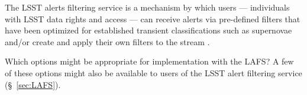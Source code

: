 \documentclass[DM,lsstdraft,authoryear,toc]{lsstdoc}
\begin{document}
The LSST alerts filtering service is a mechanism by which users --- individuals with LSST data rights and access --- can receive alerts via pre-defined filters that have been optimized for established transient classifications such as supernovae and/or create and apply their own filters to the stream . 

Which options might be appropriate for implementation with the LAFS?
A few of these options might also be available to users of the LSST alert filtering service (\S~\ref{sec:LAFS}).



\end{document}

